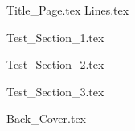 \documentclass[10pt]{article}
\theoremstyle{definition}
\begin{document}
{Title_Page.tex}
{Lines.tex}

\renewcommand{\contentsname}{\centering Directory}
\tableofcontents{}
\newpage

{Test_Section_1.tex}

{Test_Section_2.tex}

{Test_Section_3.tex}

{Back_Cover.tex}
\end{document}
